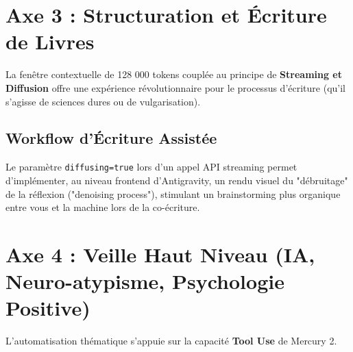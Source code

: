 \documentclass[12pt,a4paper]{article}
\begin{document}
\newpage
\section{Axe 3 : Structuration et Écriture de Livres}

La fenêtre contextuelle de 128 000 tokens couplée au principe de \textbf{Streaming et Diffusion} offre une expérience révolutionnaire pour le processus d'écriture (qu'il s'agisse de sciences dures ou de vulgarisation).

\subsection{Workflow d'Écriture Assistée}
\begin{center}
\end{center}

Le paramètre \texttt{diffusing=true} lors d'un appel API streaming permet d'implémenter, au niveau frontend d'Antigravity, un rendu visuel du "débruitage" de la réflexion ("denoising process"), stimulant un brainstorming plus organique entre vous et la machine lors de la co-écriture.

\section{Axe 4 : Veille Haut Niveau (IA, Neuro-atypisme, Psychologie Positive)}

L'automatisation thématique s'appuie sur la capacité \textbf{Tool Use} de Mercury 2.
\end{document}
